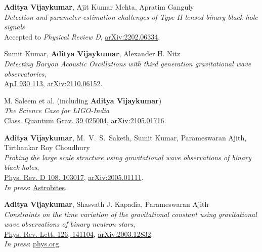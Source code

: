 \begin{etaremune}
	\item \textbf{Aditya Vijaykumar}, Ajit Kumar Mehta, Apratim Ganguly\\
	\textit{Detection and parameter estimation challenges of Type-II lensed binary black hole signals}\\
	Accepted to \textit{Physical Review D}, \href{https://arxiv.org/abs/2202.06334}{arXiv:2202.06334}.

	\item 
	Sumit Kumar, \textbf{Aditya Vijaykumar}, Alexander H. Nitz\\
	\textit{Detecting Baryon Acoustic Oscillations with third generation gravitational wave observatories},\\
	\href{https://iopscience.iop.org/article/10.3847/1538-4357/ac5e34}{ApJ 930 113}, \href{https://arxiv.org/abs/2110.06152}{arXiv:2110.06152}.

	\item M. Saleem et al. (including \textbf{Aditya Vijaykumar})\\
	\textit{The Science Case for LIGO-India}\\
	\href{https://iopscience.iop.org/article/10.1088/1361-6382/ac3b99}{Class. Quantum Grav. 39 025004}, \href{https://arxiv.org/abs/2105.01716}{arXiv:2105.01716}.
	
	\item 
	\textbf{Aditya Vijaykumar}, M.~V.~S.~Saketh, Sumit Kumar, Parameswaran Ajith, Tirthankar Roy Choudhury\\
	\textit{Probing the large scale structure using gravitational wave observations of binary black holes},\\
	\href{https://journals.aps.org/prd/abstract/10.1103/PhysRevD.108.103017}{Phys. Rev. D 108, 103017}, \href{https://arxiv.org/abs/2005.01111}{arXiv:2005.01111}.\\
	\textit{In press}: \href{https://astrobites.org/2020/05/07/binary-black-holes-tangled-up-in-the-cosmic-web/}{Astrobites}.
	
	\item 
	\textbf{Aditya Vijaykumar}, Shasvath J. Kapadia, Parameswaran Ajith\\
	\textit{Constraints on the time variation of the gravitational constant using gravitational wave observations of binary neutron stars},\\
	\href{https://journals.aps.org/prl/abstract/10.1103/PhysRevLett.126.141104}{{Phys. Rev. Lett}. 126, 141104}, \href{https://arxiv.org/abs/2003.12832}{arXiv:2003.12832}.\\
	\textit{In press}: \href{https://phys.org/news/2021-05-constraints-variation-gravitational-constant.html}{phys.org}.

\end{etaremune}

